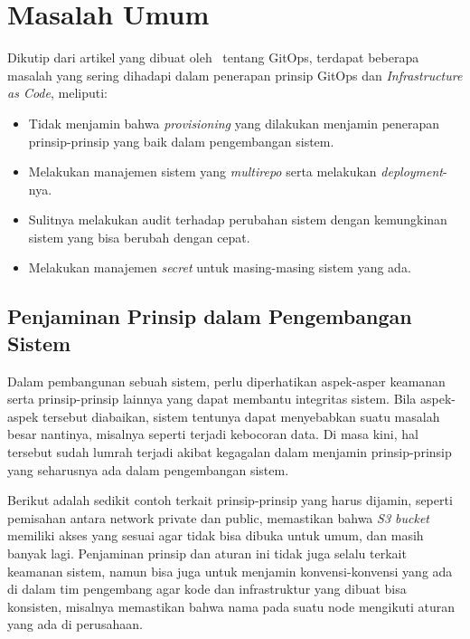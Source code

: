 \section{Masalah Umum}\label{problems}


Dikutip dari artikel yang dibuat oleh~\cite{chrisward} tentang GitOps, terdapat beberapa masalah yang sering dihadapi dalam penerapan prinsip GitOps dan \textit{Infrastructure as Code}, meliputi:

\begin{itemize}
  \item Tidak menjamin bahwa \textit{provisioning} yang dilakukan menjamin penerapan prinsip-prinsip yang baik dalam pengembangan sistem.
  \item Melakukan manajemen sistem yang \textit{multirepo} serta melakukan \textit{deployment}-nya.
  \item Sulitnya melakukan audit terhadap perubahan sistem dengan kemungkinan sistem yang bisa berubah dengan cepat.
  \item Melakukan manajemen \textit{secret} untuk masing-masing sistem yang ada.
\end{itemize}

\subsection{Penjaminan Prinsip dalam Pengembangan Sistem}

Dalam pembangunan sebuah sistem, perlu diperhatikan aspek-asper keamanan serta prinsip-prinsip lainnya yang dapat membantu integritas sistem. Bila aspek-aspek tersebut diabaikan, sistem tentunya dapat menyebabkan suatu masalah besar nantinya, misalnya seperti terjadi kebocoran data. Di masa kini, hal tersebut sudah lumrah terjadi akibat kegagalan dalam menjamin prinsip-prinsip yang seharusnya ada dalam pengembangan sistem.

Berikut adalah sedikit contoh terkait prinsip-prinsip yang harus dijamin, seperti pemisahan antara network private dan public, memastikan bahwa \textit{S3 bucket} memiliki akses yang sesuai agar tidak bisa dibuka untuk umum, dan masih banyak lagi. Penjaminan prinsip dan aturan ini tidak juga selalu terkait keamanan sistem, namun bisa juga untuk menjamin konvensi-konvensi yang ada di dalam tim pengembang agar kode dan infrastruktur yang dibuat bisa konsisten, misalnya memastikan bahwa nama pada suatu node mengikuti aturan yang ada di perusahaan.

